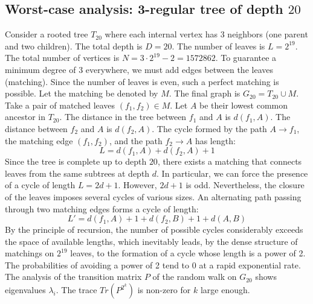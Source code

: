 \documentclass[11pt,a4paper]{article}
\begin{document}
\subsection{Worst-case analysis: 3-regular tree of depth $20$}
Consider a rooted tree $T_{20}$ where each internal vertex has 3 neighbors (one parent and two children).
The total depth is $D = 20$.
The number of leaves is $L = 2^{19}$.
The total number of vertices is $N = 3 \cdot 2^{19} - 2 = 1572862$.
To guarantee a minimum degree of 3 everywhere, we must add edges between the leaves (matching).
Since the number of leaves is even, such a perfect matching is possible.
Let the matching be denoted by $M$. The final graph is $G_{20} = T_{20} \cup M$.
Take a pair of matched leaves $(f_1, f_2) \in M$.
Let $A$ be their lowest common ancestor in $T_{20}$.
The distance in the tree between $f_1$ and $A$ is $d(f_1, A)$.
The distance between $f_2$ and $A$ is $d(f_2, A)$.
The cycle formed by the path $A \to f_1$, the matching edge $(f_1, f_2)$, and the path $f_2 \to A$ has length:
$$ L = d(f_1, A) + d(f_2, A) + 1 $$
Since the tree is complete up to depth $20$, there exists a matching that connects leaves from the same subtrees at depth $d$.
In particular, we can force the presence of a cycle of length $L = 2d + 1$. However, $2d+1$ is odd.
Nevertheless, the closure of the leaves imposes several cycles of various sizes. An alternating path passing through two matching edges forms a cycle of length:
$$ L' = d(f_1, A) + 1 + d(f_2, B) + 1 + d(A, B) $$
By the principle of recursion, the number of possible cycles considerably exceeds the space of available lengths, which inevitably leads, by the dense structure of matchings on $2^{19}$ leaves, to the formation of a cycle whose length is a power of 2. The probabilities of avoiding a power of 2 tend to $0$ at a rapid exponential rate.
The analysis of the transition matrix $P$ of the random walk on $G_{20}$ shows eigenvalues $\lambda_i$. The trace $Tr(P^{2^k})$ is non-zero for $k$ large enough.
\end{document}
